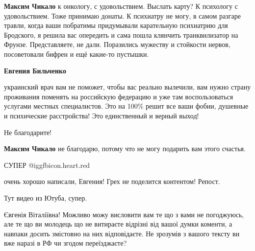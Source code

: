 \begin{itemize}
\begin{itemize}
\textbf{Максим Чикало} к онкологу, с удовольствием. Выслать карту? К психологу с удовольствием. Тоже принимаю донаты. К психиатру не могу, в самом разгаре травли, когда ваши побратимы придумывали карательную психиатрию для Бродского, я решила вас опередить и сама пошла клянчить транквилизатор на Фрунзе. Представляете, не дали. Поразились мужеству и стойкости нервов, посоветовали бифрен и ещё какие-то пустышки.

\textbf{Евгения Бильченко} 

украинский врач вам не поможет, чтобы вас реально вылечили, вам нужно страну
проживания поменять на российскую федерацию и уже там воспользоваться услугами
местных специалистов. Это на 100\% решит все ваши фобии, душевные и психические
расстройства! Это единственный и верный выход!

Не благодарите!

\textbf{Максим Чикало} не благодарю, потому что не могу подарить вам этого счастья.
\end{itemize} %

СУПЕР @igg{fbicon.heart.red}

очень хорошо написали, Евгения!
Грех не поделится контентом!
Репост.

Тут видео из Ютуба, супер.


Євгенія Віталіївна! Можливо можу висловити вам те що з вами не погоджуюсь, але
те що ви молодець що не витираєте відрізні від вашої думки коменти, а навпаки
досить змістовно на них відповідаєте. Не зрозумів з вашого тексту ви вже наразі
в РФ чи згодом переїзджаєте?

\end{itemize} %
